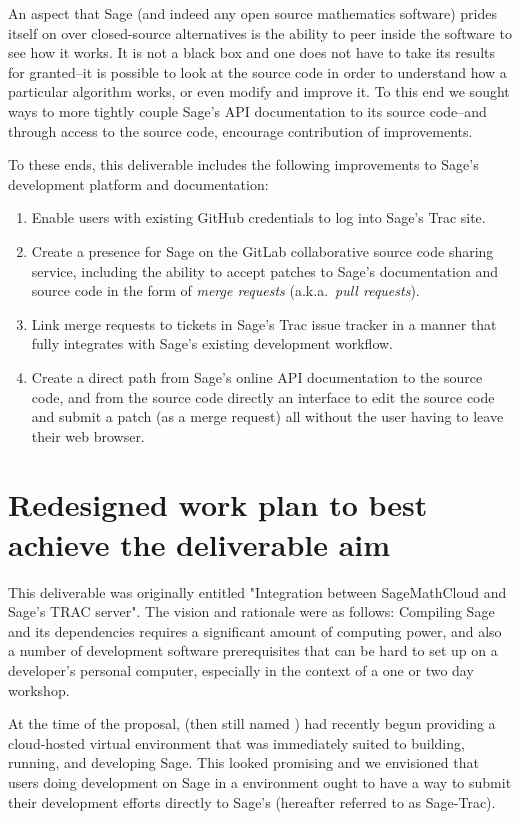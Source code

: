 An aspect that Sage (and indeed any open source mathematics software) prides
itself on over closed-source alternatives is the ability to peer inside the
software to see how it works.  It is not a black box and one does not have to
take its results for granted--it is possible to look at the source code in
order to understand how a particular algorithm works, or even modify and
improve it.  To this end we sought ways to more tightly couple Sage's API
documentation to its source code--and through access to the source code,
encourage contribution of improvements.

To these ends, this deliverable includes the following improvements to Sage's
development platform and documentation:
\begin{enumerate}
\item Enable users with existing GitHub credentials to log into Sage's
    Trac site.
\item Create a presence for Sage on the GitLab collaborative source code
    sharing service, including the ability to accept patches to Sage's
    documentation and source code in the form of {\em merge requests}
    (a.k.a.~{\em pull requests}).
\item Link \GitLab merge requests to tickets in Sage's Trac issue tracker in
    a manner that fully integrates with Sage's existing development workflow.
\item Create a direct path from Sage's online API documentation to the source
    code, and from the source code directly an interface to edit the source
    code and submit a patch (as a merge request) all without the user having to
    leave their web browser.
\end{enumerate}


\hypertarget{redesigned-work-plan}{%
\section{Redesigned work plan to best achieve the deliverable aim\label{redesigned-work-plan}}}

This deliverable was originally entitled "Integration between SageMathCloud and
Sage's TRAC server". The vision and rationale were as follows: Compiling Sage
and its dependencies requires a significant amount of computing power, and also
a number of development software prerequisites that can be hard to set up on a
developer's personal computer, especially in the context of a one or two day
workshop.

At the time of the proposal, \cocalc (then still named \SMC) had recently begun
providing a cloud-hosted virtual environment that was immediately suited to
building, running, and developing Sage. This looked promising and we envisioned
that users doing development on Sage in a \cocalc environment ought to have a
way to submit their development efforts directly to Sage's \Trac (hereafter
referred to as Sage-Trac).

